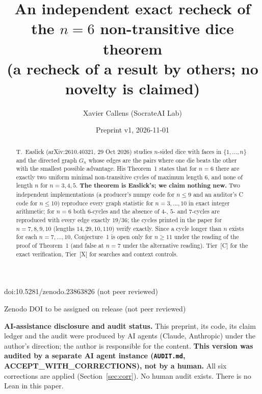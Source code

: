 \documentclass[10pt]{article}
\title{An independent exact recheck of the $n=6$ non-transitive dice theorem\\
{\large (a recheck of a result by others; no novelty is claimed)}}
\author{Xavier Callens (SocrateAI Lab)}
\date{Preprint v1, 2026-11-01}
\newcommand{\tier}[1]{\textsf{[#1]}}
\newcommand{\tC}{\tier{C}}
\newcommand{\tX}{\tier{X}}
\begin{document}
\maketitle
\begin{center}\small doi:10.5281/zenodo.23863826 \quad (not peer reviewed)\end{center}

\begin{center}\small Zenodo DOI to be assigned on release \quad (not peer reviewed)\end{center}

\noindent\textbf{AI-assistance disclosure and audit status.} This preprint, its code, its claim ledger and the audit were produced by AI agents (Claude, Anthropic) under the author's direction; the author is responsible for the content.
\textbf{This version was audited by a separate AI agent instance (\texttt{AUDIT.md}, ACCEPT\_WITH\_CORRECTIONS), not by a human.} All six corrections are applied (Section~\ref{sec:corr}). No human audit exists. There is no Lean in this paper.

\begin{abstract}
\noindent T.~Easlick (arXiv:2610.40321, 29 Oct 2026) studies $n$-sided dice with faces in $\{1,\dots,n\}$ and the directed graph $G_n$ whose edges are the pairs where one die beats the other with the smallest possible advantage. His Theorem~1 states that for $n=6$ there are exactly two uniform minimal non-transitive cycles of maximum length $6$, and none of length $n$ for $n=3,4,5$. \textbf{The theorem is Easlick's; we claim nothing new.} Two independent implementations (a producer's numpy code for $n\le9$ and an auditor's C code for $n\le10$) reproduce every graph statistic for $n=3,\dots,10$ in exact integer arithmetic; for $n=6$ both $6$-cycles and the absence of $4$-, $5$- and $7$-cycles are reproduced with every edge exactly $19/36$; the cycles printed in the paper for $n=7,8,9,10$ (lengths $14,29,10,110$) verify exactly. Since a cycle longer than $n$ exists for each $n=7,\dots,10$, Conjecture~1 is open only for $n\ge11$ under the reading of the proof of Theorem~1 (and false at $n=7$ under the alternative reading). Tier~\tC{} for the exact verification, Tier~\tX{} for searches and context controls.
\end{abstract}

\noindent{}
\end{document}
